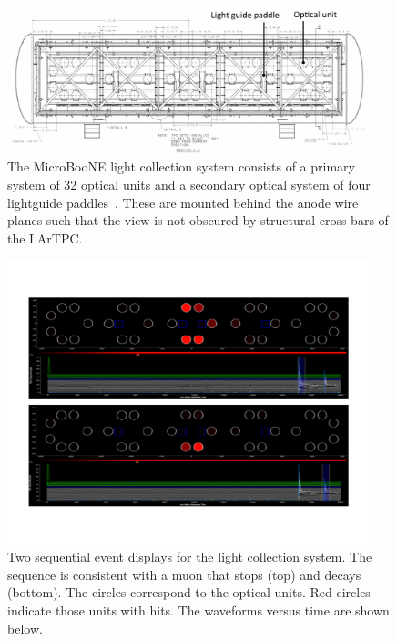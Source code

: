 \begin{figure}[t]
	\centering
              \includegraphics[width=0.95\textwidth]{./light_figures/PMTPlacement.pdf} 
        \caption{The MicroBooNE light collection system consists of a primary system of 32 optical units and a secondary optical system of four lightguide paddles~\cite{Katori:2013wqa}. These are mounted behind the anode wire planes such that the view is not obscured by structural cross bars of the LArTPC. }\label{fig:lightlayout}
\end{figure}

\begin{figure}[t]
	\centering
    \includegraphics[width=0.95\textwidth]{./light_figures/muondecay.pdf} 
    \caption{Two sequential event displays for the light collection system.  The sequence is consistent with a muon that stops (top) and decays (bottom).  The circles correspond to the optical units. Red circles indicate those units with hits.    The waveforms versus time are shown below.}\label{fig:muondecaylight}
\end{figure}


